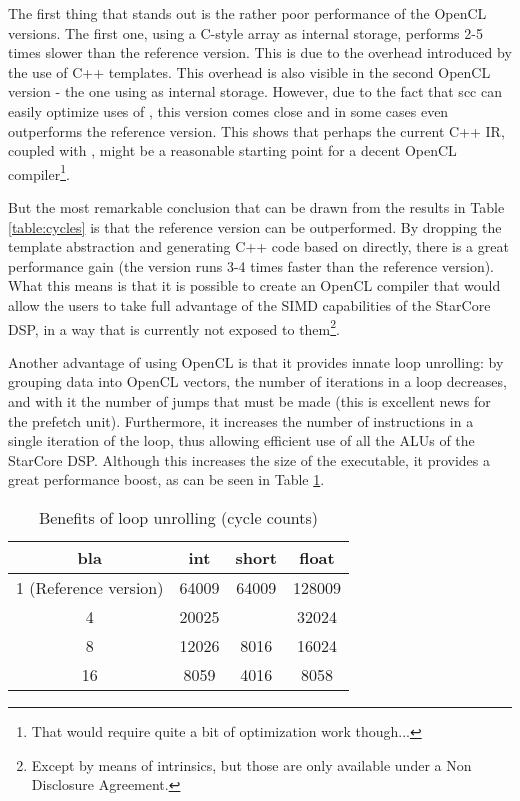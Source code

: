 The first thing that stands out is the rather poor performance of the OpenCL versions. The first one, using a C-style array as internal storage, performs 2-5 times slower than the reference version. This is due to the overhead introduced by the use of C++ templates. This overhead is also visible in the second OpenCL version - the one using \vectype{} as internal storage. However, due to the fact that scc can easily optimize uses of \vectype{}, this version comes close and in some cases even outperforms the reference version. This shows that perhaps the current C++ IR, coupled with \vectype{}, might be a reasonable starting point for a decent OpenCL compiler\footnote{That would require quite a bit of optimization work though...}. 

But the most remarkable conclusion that can be drawn from the results in Table \ref{table:cycles} is that the reference version can be outperformed. By dropping the template abstraction and generating C++ code based on \vectype{} directly, there is a great performance gain (the \vectype{} version runs 3-4 times faster than the reference version). What this means is that it is possible to create an OpenCL compiler that would allow the users to take full advantage of the SIMD capabilities of the StarCore DSP, in a way that is currently not exposed to them\footnote{Except by means of intrinsics, but those are only available under a Non Disclosure Agreement.}.

Another advantage of using OpenCL is that it provides innate loop unrolling: by grouping data into OpenCL vectors, the number of iterations in a loop decreases, and with it the number of jumps that must be made (this is excellent news for the prefetch unit). Furthermore, it increases the number of instructions in a single iteration of the loop, thus allowing efficient use of all the ALUs of the StarCore DSP. Although this increases the size of the executable, it provides a great performance boost, as can be seen in Table \ref{table:unrolling}. 

\begin{table}[htb]
	\centering
  \caption{Benefits of loop unrolling (cycle counts)}
  \label{table:unrolling}
  \begin{tabular}{|*{4}{c|}}
  	\hline
    bla	& int			& short		& float		\\[2ex]
    \hline
    1 (Reference version) 							& 64009		& 64009		& 128009	\\
    \hline
    4														 				& 20025		& 				& 32024		\\
    \hline
    8																		& 12026		& 8016		& 16024		\\
    \hline
    16																 	& 8059		& 4016		& 8058		\\
    \hline
  \end{tabular}
\end{table}

